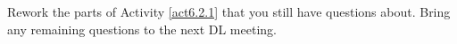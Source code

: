 \label{fnt6.2.1-1}

Rework the parts of Activity \ref{act6.2.1} that you still have questions about. Bring any remaining questions to the next DL meeting.